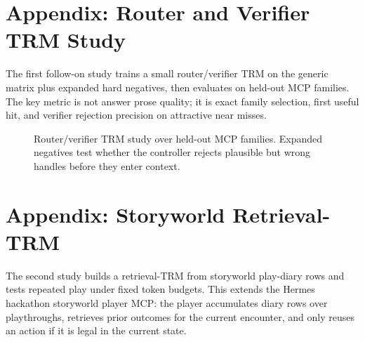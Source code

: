 \documentclass[11pt]{article}
\begin{document}
\appendix

\section{Appendix: Router and Verifier TRM Study}

The first follow-on study trains a small router/verifier TRM on the generic matrix plus expanded hard negatives, then evaluates on held-out MCP families. The key metric is not answer prose quality; it is exact family selection, first useful hit, and verifier rejection precision on attractive near misses.

\begin{figure}[h]
\centering
{}
\caption{Router/verifier TRM study over held-out MCP families. Expanded negatives test whether the controller rejects plausible but wrong handles before they enter context.}
\label{fig:appendix-router-verifier}
\end{figure}

\section{Appendix: Storyworld Retrieval-TRM}

The second study builds a retrieval-TRM from storyworld play-diary rows and tests repeated play under fixed token budgets. This extends the Hermes hackathon storyworld player MCP: the player accumulates diary rows over playthroughs, retrieves prior outcomes for the current encounter, and only reuses an action if it is legal in the current state.
\end{document}
